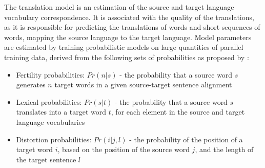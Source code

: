 The translation model is an estimation of the source and target language vocabulary correspondence. It is associated with the quality of the translations, as it is responsible for predicting the translations of words and short sequences of words, mapping the source language to the target language. Model parameters are estimated by training probabilistic models on large quantities of parallel training data, derived from the following sets of probabilities as proposed by \cite{brown_statistical_1990}:
\begin{itemize}
    \item Fertility probabilities:  $Pr(n|s)$ - the probability that a source word $s$ generates $n$ target words in a given source-target sentence alignment
    
    \item Lexical probabilities: $Pr(s|t)$ - the probability that a source word $s$ translates into a target word $t$, for each element in the source and target language vocabularies
    
    \item Distortion probabilities: $Pr(i|j, l)$ - the probability of the position of a target word $i$, based on the position of the source word $j$, and the length of the target sentence $l$
    
    
\end{itemize}



